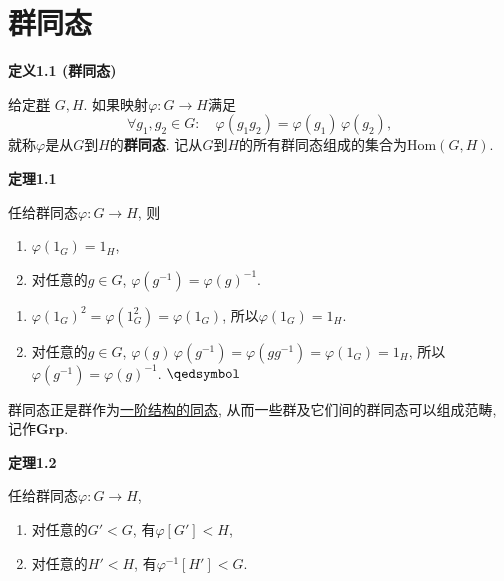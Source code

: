 \documentclass[UTF8]{ctexart}
\begin{document}
\setlength{\abovedisplayskip}{1pt}
\setlength{\belowdisplayskip}{1pt}

\section{群同态}

\hypertarget{sec:定义1.1}{}
\noindent\textbf{定义1.1 (群同态)}

给定\href{01 半群与群#nameddest=sec:定义2.1}{群} $G,H$. 如果映射$\varphi:G\to H$满足
\[
    \forall g_1,g_2\in G:\quad\varphi(g_1g_2)=\varphi(g_1)\,\varphi(g_2),
\]
就称$\varphi$是从$G$到$H$的\textbf{群同态}.
记从$G$到$H$的所有群同态组成的集合为$\mathrm{Hom}(G,H)$.

\vspace{10pt}

\hypertarget{sec:定理1.1}{}
\noindent\textbf{定理1.1}

任给群同态$\varphi:G\to H$, 则
\begin{enumerate}
    \item $\varphi(1_G)=1_H$,
    \item 对任意的$g\in G$, $\varphi(g^{-1})=\varphi(g)^{-1}$.
\end{enumerate}


\begin{enumerate}
    \item $\varphi(1_G)^2=\varphi(1_G^2)=\varphi(1_G)$, 所以$\varphi(1_G)=1_H$.
    \item 对任意的$g\in G$, $\varphi(g)\,\varphi(g^{-1})=\varphi(gg^{-1})
    =\varphi(1_G)=1_H$, 所以$\varphi(g^{-1})=\varphi(g)^{-1}$. \hfill $\qedsymbol$
\end{enumerate}

\vspace{10pt}

群同态正是群作为\href{../../../06 数理逻辑/01 一阶逻辑/02 一阶模型论/01 一阶语言的结构/02 结构的同态#nameddest=sec:定义1.1}
{一阶结构的同态}, 从而一些群及它们间的群同态可以组成范畴, 记作$\mathbf{Grp}$.

\vspace{10pt}

\hypertarget{sec:定理1.2}{}
\noindent\textbf{定理1.2}

任给群同态$\varphi:G\to H$,
\begin{enumerate}
    \item 对任意的$G'<G$, 有$\varphi[G']<H$,
    \item 对任意的$H'<H$, 有$\varphi^{-1}[H']<G$.
\end{enumerate}
\end{document}
